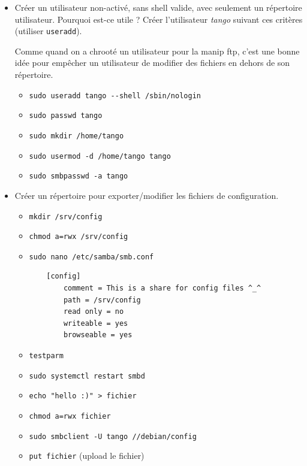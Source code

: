 \documentclass[a4paper]{article}
\begin{document}
\begin{itemize}
\item Créer un utilisateur non-activé, sans shell valide, avec seulement un répertoire utilisateur. Pourquoi est-ce utile ? Créer l'utilisateur \textit{tango} suivant ces critères (utiliser \texttt{useradd}).
\begin{example}
    Comme quand on a chrooté un utilisateur pour la manip ftp, c'est une bonne idée pour empêcher un utilisateur de modifier des fichiers en dehors de son répertoire.
    \begin{itemize}
        \item \texttt{sudo useradd tango -{}-shell /sbin/nologin}
        \item \texttt{sudo passwd tango}
        \item \texttt{sudo mkdir /home/tango}
        \item \texttt{sudo usermod -d /home/tango tango}
        \item \texttt{sudo smbpasswd -a tango}
    \end{itemize}
\end{example}

\item Créer un répertoire pour exporter/modifier les fichiers de configuration.
\begin{example}
    \begin{itemize}
        \item \texttt{mkdir /srv/config}
        \item \texttt{chmod a=rwx /srv/config}
        \item \texttt{sudo nano /etc/samba/smb.conf}
        \begin{verbatim}
    [config]
        comment = This is a share for config files ^_^
        path = /srv/config
        read only = no
        writeable = yes
        browseable = yes
        \end{verbatim}
        \item \texttt{testparm}
        \item \texttt{sudo systemctl restart smbd}
        \item \texttt{echo "hello :)" > fichier}
        \item \texttt{chmod a=rwx fichier}
        \item \texttt{sudo smbclient -U tango //debian/config}
        \item \texttt{put fichier} (upload le fichier)
    \end{itemize}
\end{example}

\end{itemize}
\end{document}
